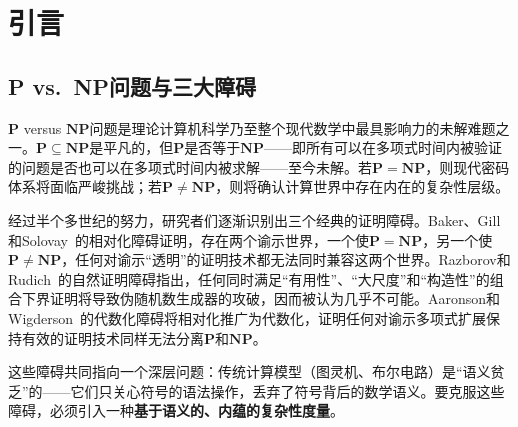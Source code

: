 \documentclass{ctexart}
\begin{document}
\begin{abstract}
		该证明完全建立在障碍无关的不变量 $\kappa(L)$ 之上，不受相对化、自然证明和代数化三大障碍的约束。整个证明在ZFC公理体系内完成。我们进一步讨论了该证明与经典P vs.\ NP问题的关系：$\mathbf{P} \neq \mathbf{NP}$ 在集合论意义下为真，且在ZFC内可证；但该证明无法在经典图灵机模型的操作语义内部被复制，因为经典语言缺乏正面定义非确定性独立性所需的概念资源（不可公度性作为操作语义的内在属性），且经典NP定义在操作上不自足、在语义上残缺——将见证从虚部拷贝到实部（不可实现），导致不可公度性和对偶性的丢失——使得本质维度$\kappa(L)$在经典模型中根本不可定义。这一双重定位——``解决''（确认了 $\mathbf{P} \neq \mathbf{NP}$ 的真值）与``消解''（揭示了经典框架的表达局限和概念错误）并存——精确地反映了本文工作的数学内容和哲学意义。
		
		\vspace{0.5cm}
		\noindent \textbf{关键词：} 虚部验证机，本质维度，障碍无关性，分支-激活引理，验证敏感性定理，信息论下界，对偶性，操作不自足，$\mathbf{P} \neq \mathbf{NP}$
	\end{abstract}
	
	\section{引言}
	
	\subsection{P vs.\ NP问题与三大障碍}
	
	$\mathbf{P}$ versus $\mathbf{NP}$问题\cite{cook1971,levin1973}是理论计算机科学乃至整个现代数学中最具影响力的未解难题之一。$\mathbf{P} \subseteq \mathbf{NP}$是平凡的，但$\mathbf{P}$是否等于$\mathbf{NP}$——即所有可以在多项式时间内被验证的问题是否也可以在多项式时间内被求解——至今未解。若$\mathbf{P} = \mathbf{NP}$，则现代密码体系将面临严峻挑战；若$\mathbf{P} \neq \mathbf{NP}$，则将确认计算世界中存在内在的复杂性层级。
	
	经过半个多世纪的努力，研究者们逐渐识别出三个经典的证明障碍。Baker、Gill和Solovay~\cite{baker1975}的相对化障碍证明，存在两个谕示世界，一个使$\mathbf{P}=\mathbf{NP}$，另一个使$\mathbf{P}\neq\mathbf{NP}$，任何对谕示``透明''的证明技术都无法同时兼容这两个世界。Razborov和Rudich~\cite{razborov1997}的自然证明障碍指出，任何同时满足``有用性''、``大尺度''和``构造性''的组合下界证明将导致伪随机数生成器的攻破，因而被认为几乎不可能。Aaronson和Wigderson~\cite{aaronson2009}的代数化障碍将相对化推广为代数化，证明任何对谕示多项式扩展保持有效的证明技术同样无法分离$\mathbf{P}$和$\mathbf{NP}$。
	
	这些障碍共同指向一个深层问题：传统计算模型（图灵机、布尔电路）是``语义贫乏''的——它们只关心符号的语法操作，丢弃了符号背后的数学语义。要克服这些障碍，必须引入一种\textbf{基于语义的、内蕴的复杂性度量}。
	
\end{document}
